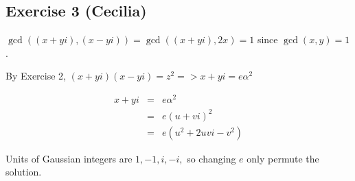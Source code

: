\subsection*{Exercise 3 (Cecilia)}
$ \gcd((x + yi), (x - yi)) = \gcd((x + yi), 2x) = 1 $ since $ \gcd(x, y) = 1 $.

By Exercise 2, $ (x + yi)(x - yi) = z^2 => x + yi = e \alpha^2 $

\begin{eqnarray*}
  x + yi &=& e \alpha^2   \\
         &=& e (u + vi)^2 \\
         &=& e (u^2 + 2uvi -v^2)
\end{eqnarray*}

Units of Gaussian integers are $ 1, -1, i, -i, $ so changing $ e $ only permute the solution.